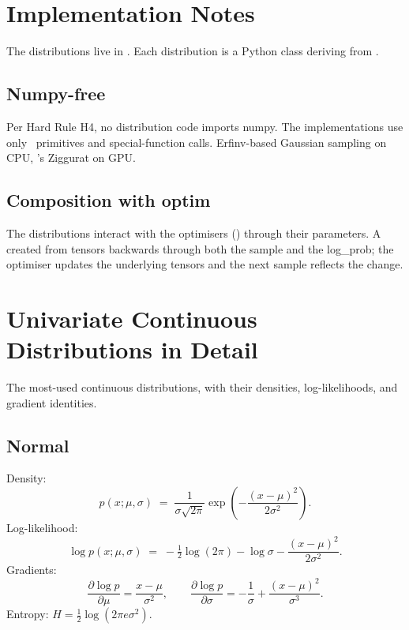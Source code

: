 \section{Implementation Notes}
\label{sec:distributions:impl}

The distributions live in . Each
distribution is a Python class deriving from .

\subsection{Numpy-free}
\label{ssec:distributions:numpy_free}

Per Hard Rule H4, no distribution code imports numpy. The
implementations use only \Lucid\ primitives and special-function
calls. Erfinv-based Gaussian sampling on CPU,
\Lucid's Ziggurat on GPU.

\subsection{Composition with optim}
\label{ssec:distributions:compose_optim}

The distributions interact with the optimisers
() through their parameters. A
 created from 
tensors backwards through both the sample and the log\_prob; the
optimiser updates the underlying tensors and the next sample
reflects the change.

\section{Univariate Continuous Distributions in Detail}
\label{sec:distributions:continuous_detail}

The most-used continuous distributions, with their densities,
log-likelihoods, and gradient identities.

\subsection{Normal}
\label{ssec:distributions:normal_detail}

Density:
\[
p(x; \mu, \sigma) \;=\; \frac{1}{\sigma\sqrt{2\pi}}
\exp\!\left(-\frac{(x - \mu)^2}{2\sigma^2}\right).
\]
Log-likelihood:
\[
\log p(x; \mu, \sigma) \;=\; -\tfrac{1}{2}\log(2\pi) - \log\sigma
- \frac{(x - \mu)^2}{2\sigma^2}.
\]
Gradients:
\[
\frac{\partial \log p}{\partial \mu} = \frac{x - \mu}{\sigma^2},
\qquad
\frac{\partial \log p}{\partial \sigma} = -\frac{1}{\sigma} +
\frac{(x - \mu)^2}{\sigma^3}.
\]
Entropy: $H = \tfrac{1}{2}\log(2\pi e \sigma^2)$.

